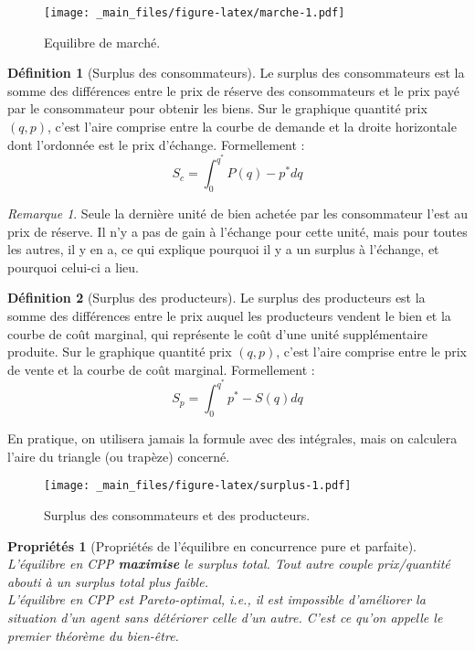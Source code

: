 \documentclass[
  a4paper,
]{book}
\newtheorem{proposition}{Propriétés}[chapter]
\theoremstyle{definition}
\newtheorem{definition}{Définition}[chapter]
\theoremstyle{definition}
\theoremstyle{definition}
\theoremstyle{definition}
\theoremstyle{remark}
\newtheorem*{remark}{Remarque}
\begin{document}
\begin{figure}
\centering
\texttt{[image: \_main\_files/figure-latex/marche-1.pdf]}
\caption{\label{fig:marche}Equilibre de marché.}
\end{figure}

\begin{definition}[Surplus des consommateurs]
Le surplus des consommateurs est la somme des différences entre le prix de réserve des consommateurs et le prix payé par le consommateur pour obtenir les biens.
Sur le graphique quantité prix \((q, p)\), c'est l'aire comprise entre la courbe de demande et la droite horizontale dont l'ordonnée est le prix d'échange.
Formellement :
\[S_c=\int_0^{q^*}P(q)-p^* dq\]
\end{definition}

\begin{remark}
Seule la dernière unité de bien achetée par les consommateur l'est au prix de réserve.
Il n'y a pas de gain à l'échange pour cette unité, mais pour toutes les autres, il y en a, ce qui explique pourquoi il y a un surplus à l'échange, et pourquoi celui-ci a lieu.
\end{remark}

\begin{definition}[Surplus des producteurs]
Le surplus des producteurs est la somme des différences entre le prix auquel les producteurs vendent le bien et la courbe de coût marginal, qui représente le coût d'une unité supplémentaire produite.
Sur le graphique quantité prix \((q, p)\), c'est l'aire comprise entre le prix de vente et la courbe de coût marginal.
Formellement :
\[S_p=\int_0^{q^*}p^*-S(q) dq\]
\end{definition}

En pratique, on utilisera jamais la formule avec des intégrales, mais on calculera l'aire du triangle (ou trapèze) concerné.

\begin{figure}
\centering
\texttt{[image: \_main\_files/figure-latex/surplus-1.pdf]}
\caption{\label{fig:surplus}Surplus des consommateurs et des producteurs.}
\end{figure}

\begin{proposition}[Propriétés de l'équilibre en concurrence pure et parfaite]
\protect\hypertarget{prp:cppprop}{}\label{prp:cppprop}L'équilibre en CPP \textbf{maximise} le \emph{surplus total}.
Tout autre couple prix/quantité abouti à un surplus total plus faible.\\
L'équilibre en CPP est \emph{Pareto-optimal}, i.e., il est impossible d'améliorer la situation d'un agent sans détériorer celle d'un autre.
C'est ce qu'on appelle le \emph{premier théorème du bien-être}.
\end{proposition}
\end{document}

